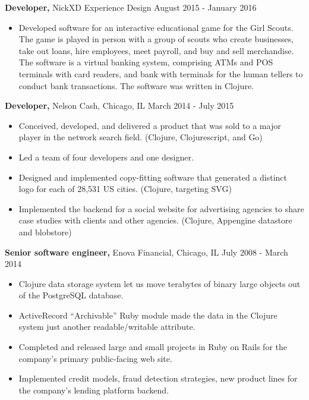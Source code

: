 \documentclass[margin]{res}
\begin{document}
\begin{resume}
{\bf Developer,} NickXD Experience Design \hfill August 2015 - January 2016
\begin{itemize} \itemsep -2pt %
\item Developed software for an interactive educational game for the Girl Scouts. The game is played in person with a group of scouts who create businesses, take out loans, hire employees, meet payroll, and buy and sell merchandise. The software is a virtual banking system, comprising ATMs and POS terminals with card readers, and bank with terminals for the human tellers to conduct bank transactions. The software was written in Clojure.
\end{itemize}


{\bf Developer,} Nelson Cash, Chicago, IL \hfill March 2014 - July 2015
\begin{itemize} \itemsep -2pt %
\item Conceived, developed, and delivered a product that was sold to a major player in the network search field. (Clojure, Clojurescript, and Go)
\item Led a team of four developers and one designer.
\item Designed and implemented copy-fitting software that generated a distinct logo for each of 28,531 US cities. (Clojure, targeting SVG)
\item Implemented the backend for a social website for advertising agencies to share case studies with clients and other agencies.  (Clojure, Appengine datastore and blobstore)
\end{itemize}

{\bf Senior software engineer,} Enova Financial, Chicago, IL \hfill July 2008 - March 2014
\begin{itemize} \itemsep -2pt %
\item Clojure data storage system let us move terabytes of binary large objects out of the PostgreSQL database.
\item ActiveRecord ``Archivable'' Ruby module made the data in the Clojure system just another readable/writable attribute.
\item Completed and released large and small projects in Ruby on Rails for the company's primary public-facing web site.
\item Implemented credit models, fraud detection strategies, new product lines for the company's lending platform backend.
\end{itemize}



\end{resume}
\end{document}
